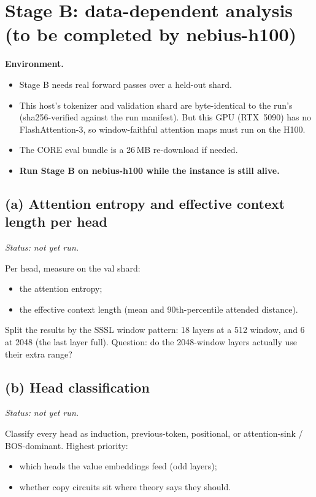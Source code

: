 \documentclass[11pt]{article}
\begin{document}
\section{Stage B: data-dependent analysis (to be completed by nebius-h100)}
\label{sec:stageB}
\noindent{}

\medskip\noindent\textbf{Environment.}
\begin{itemize}
\item Stage B needs real forward passes over a held-out shard.
\item This host's tokenizer and validation shard  are byte-identical to the run's (sha256-verified against the run manifest). But this GPU (RTX~5090) has no FlashAttention-3, so window-faithful attention maps must run on the H100.
\item The CORE eval bundle is a 26\,MB re-download if needed.
\item \textbf{Run Stage B on nebius-h100 while the instance is still alive.}
\end{itemize}

\subsection*{(a) Attention entropy and effective context length per head}
\textit{Status: not yet run.}

Per head, measure on the val shard:
\begin{itemize}
\item the attention entropy;
\item the effective context length (mean and 90th-percentile attended distance).
\end{itemize}
Split the results by the SSSL window pattern: 18 layers at a 512 window, and 6 at 2048 (the last layer full). Question: do the 2048-window layers actually use their extra range?

\subsection*{(b) Head classification}
\textit{Status: not yet run.}

Classify every head as induction, previous-token, positional, or attention-sink / BOS-dominant. Highest priority:
\begin{itemize}
\item which heads the value embeddings feed (odd layers);
\item whether copy circuits sit where theory says they should.
\end{itemize}
\end{document}
